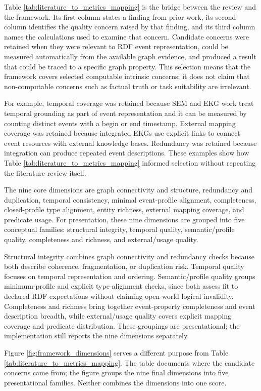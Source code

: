Table \ref{tab:literature_to_metrics_mapping} is the bridge between the review and the framework. Its first column states a finding from prior work, its second column identifies the quality concern raised by that finding, and its third column names the calculations used to examine that concern. Candidate concerns were retained when they were relevant to RDF event representation, could be measured automatically from the available graph evidence, and produced a result that could be traced to a specific graph property. This selection means that the framework covers selected computable intrinsic concerns; it does not claim that non-computable concerns such as factual truth or task suitability are irrelevant.

For example, temporal coverage was retained because SEM and EKG work treat temporal grounding as part of event representation and it can be measured by counting distinct events with a begin or end timestamp. External mapping coverage was retained because integrated EKGs use explicit links to connect event resources with external knowledge bases. Redundancy was retained because integration can produce repeated event descriptions. These examples show how Table \ref{tab:literature_to_metrics_mapping} informed selection without repeating the literature review itself.

The nine core dimensions are graph connectivity and structure, redundancy and duplication, temporal consistency, minimal event-profile alignment, completeness, closed-profile type alignment, entity richness, external mapping coverage, and predicate usage. For presentation, these nine dimensions are grouped into five conceptual families: structural integrity, temporal quality, semantic/profile quality, completeness and richness, and external/usage quality.

Structural integrity combines graph connectivity and redundancy checks because both describe coherence, fragmentation, or duplication risk. Temporal quality focuses on temporal representation and ordering. Semantic/profile quality groups minimum-profile and explicit type-alignment checks, since both assess fit to declared RDF expectations without claiming open-world logical invalidity. Completeness and richness bring together event-property completeness and event description breadth, while external/usage quality covers explicit mapping coverage and predicate distribution. These groupings are presentational; the implementation still reports the nine dimensions separately.

Figure \ref{fig:framework_dimensions} serves a different purpose from Table \ref{tab:literature_to_metrics_mapping}. The table documents where the candidate concerns came from; the figure groups the nine final dimensions into five presentational families. Neither combines the dimensions into one score.

